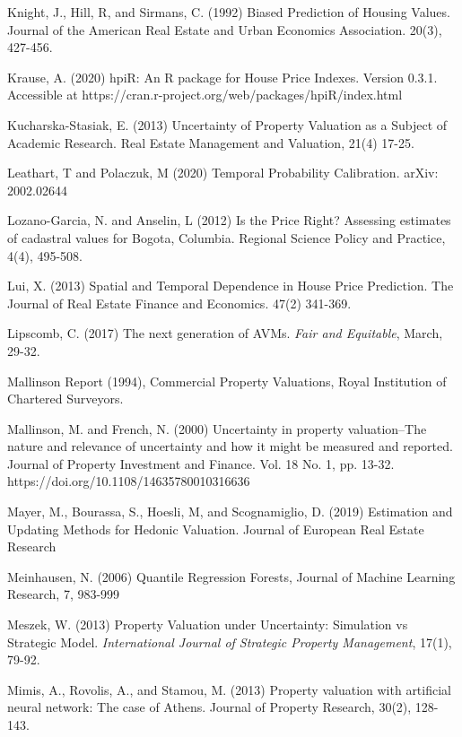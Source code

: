 \documentclass[colTwo]{anon}
\theoremstyle{definition}
\begin{document}
\begin{thebibliography}{50}
\harvarditem{}{}{}Knight, J., Hill, R, and Sirmans, C. (1992) Biased Prediction of Housing Values. Journal of the American Real Estate and Urban Economics Association. 20(3), 427-456. 

\harvarditem{}{}{}Krause, A. (2020) hpiR: An R package for House Price Indexes.  Version 0.3.1.  Accessible at https://cran.r-project.org/web/packages/hpiR/index.html

\harvarditem{}{}{}Kucharska-Stasiak, E. (2013) Uncertainty of Property Valuation as a Subject of Academic Research. Real Estate Management and Valuation, 21(4) 17-25.

\harvarditem{}{}{}Leathart, T and Polaczuk, M  (2020) Temporal Probability Calibration. arXiv: 2002.02644

\harvarditem{}{}{}Lozano-Garcia, N. and Anselin, L (2012) Is the Price Right?  Assessing estimates of cadastral values for Bogota, Columbia. Regional Science Policy and Practice, 4(4), 495-508.

\harvarditem{}{}{}Lui, X. (2013) Spatial and Temporal Dependence in House Price Prediction. The Journal of Real Estate Finance and Economics. 47(2) 341-369. 
 
\harvarditem{}{}{}Lipscomb, C. (2017) The next generation of AVMs. \textit{Fair and Equitable}, March, 29-32.  

\harvarditem{}{}{}Mallinson Report (1994), Commercial Property Valuations, Royal Institution of Chartered Surveyors.

\harvarditem{}{}{}Mallinson, M. and French, N. (2000) Uncertainty in property valuation--The nature and relevance of uncertainty and how it might be measured and reported. Journal of Property Investment and Finance. Vol. 18 No. 1, pp. 13-32. https://doi.org/10.1108/14635780010316636

\harvarditem{}{}{}Mayer, M., Bourassa, S., Hoesli, M, and Scognamiglio, D. (2019) Estimation and Updating Methods for Hedonic Valuation. Journal of European Real Estate Research

\harvarditem{}{}{}Meinhausen, N.  (2006) Quantile Regression Forests, Journal of Machine Learning Research, 7, 983-999

\harvarditem{}{}{}Meszek, W. (2013) Property Valuation under Uncertainty: Simulation vs Strategic Model. \textit{International Journal of Strategic Property Management}, 17(1), 79-92. 

\harvarditem{}{}{}Mimis, A., Rovolis, A., and Stamou, M. (2013) Property valuation with artificial neural network: The case of Athens. Journal of Property Research, 30(2), 128-143. 


\end{thebibliography}
\end{document}

